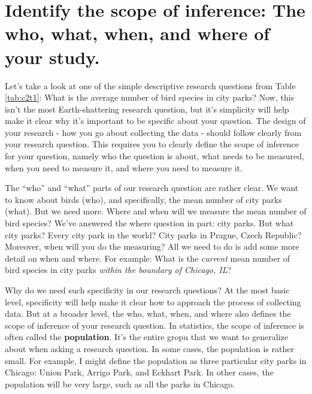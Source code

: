 \documentclass[
]{book}
\begin{document}
\section{Identify the scope of inference: The who, what, when, and where of your study.}\label{identify-the-scope-of-inference-the-who-what-when-and-where-of-your-study.}

Let's take a look at one of the simple descriptive research questions from Table \ref{tab:c2t1}: What is the average number of bird species in city parks? Now, this isn't the most Earth-shattering research question, but it's simplicity will help make it clear why it's important to be specific about your question. The design of your research - how you go about collecting the data - should follow clearly from your research question. This requires you to clearly define the scope of inference for your question, namely who the question is about, what needs to be measured, when you need to measure it, and where you need to measure it.

The ``who'' and ``what'' parts of our research question are rather clear. We want to know about birds (who), and specifically, the mean number of city parks (what). But we need more. Where and when will we measure the mean number of bird species? We've answered the where question in part: city parks. But what city parks? Every city park in the world? City parks in Prague, Czech Republic? Moreover, when will you do the measuring? All we need to do is add some more detail on when and where. For example: What is the \emph{current} mean number of bird species in city parks \emph{within the boundary of Chicago, IL}?

Why do we need such specificity in our research questions? At the most basic level, specificity will help make it clear how to approach the process of collecting data. But at a broader level, the who, what, when, and where also defines the scope of inference of your research question. In statistics, the scope of inference is often called the \textbf{population}. It's the entire gropu that we want to generalize about when asking a research question. In some cases, the population is rather small. For example, I might define the population as three particular city parks in Chicago: Union Park, Arrigo Park, and Eckhart Park. In other cases, the population will be very large, such as all the parks in Chicago.
\end{document}
